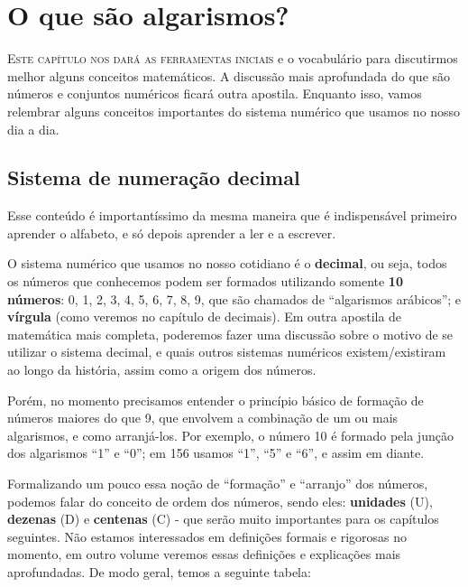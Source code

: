 \chapter{O que são algarismos?}
\label{oque_sao_algarismos}
\lettrine{E}{ste capítulo nos dará as ferramentas iniciais} e o vocabulário para discutirmos melhor alguns conceitos matemáticos. A discussão mais aprofundada do que são números e conjuntos numéricos ficará outra apostila. Enquanto isso, vamos relembrar alguns conceitos importantes do sistema numérico que usamos no nosso dia a dia.

\section{Sistema de numeração decimal}

Esse conteúdo é importantíssimo da mesma maneira que é indispensável primeiro aprender o alfabeto, e só depois aprender a ler e a escrever. 

O sistema numérico que usamos no nosso cotidiano é o \textbf{decimal}, ou seja, todos os números que conhecemos podem ser formados utilizando somente \textbf{10 números}: {0, 1, 2, 3, 4, 5, 6, 7, 8, 9}, que são chamados de “algarismos arábicos”; e \textbf{vírgula} (como veremos no capítulo de decimais). Em outra apostila de matemática mais completa, poderemos fazer uma discussão sobre o motivo de se utilizar o sistema decimal, e quais outros sistemas numéricos existem/existiram ao longo da história, assim como a origem dos números.

Porém, no momento precisamos entender o princípio básico de formação de números maiores do que 9, que envolvem a combinação de um ou mais algarismos, e como arranjá-los. Por exemplo, o número 10 é formado pela junção dos algarismos “1” e “0”; em 156 usamos “1”, “5” e “6”, e assim em diante. 

Formalizando um pouco essa noção de “formação” e “arranjo” dos números, podemos falar do conceito de ordem dos números, sendo eles: \textbf{unidades} (U), \textbf{dezenas} (D) e \textbf{centenas} (C) - que serão muito importantes para os capítulos seguintes. Não estamos interessados em definições formais e rigorosas no momento, em outro volume veremos essas definições e explicações mais aprofundadas. De modo geral, temos a seguinte tabela:


